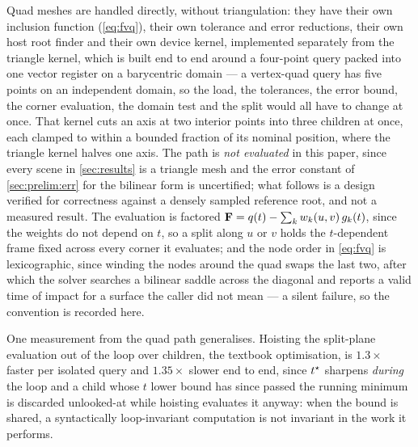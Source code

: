 Quad meshes are handled directly, without triangulation: they have their own
inclusion function (\cref{eq:fvq}), their own tolerance and error reductions,
their own host root finder and their own device kernel, implemented separately
from the triangle kernel, which is built end to end around a four-point query
packed into one vector register on a barycentric domain --- a vertex-quad query
has five points on an independent domain, so the load, the tolerances, the error
bound, the corner evaluation, the domain test and the split would all have to
change at once. That kernel cuts an axis at two interior points into three
children at once, each clamped to within a bounded fraction of its nominal
position, where the triangle kernel halves one axis. The path is \emph{not evaluated} in this paper, since every scene
in \cref{sec:results} is a triangle mesh and the error constant of
\cref{sec:prelim:err} for the bilinear form is uncertified; what follows is a
design verified for correctness against a densely sampled reference root, and not
a measured result. The evaluation is factored $\mathbf{F} = q(t) - \sum_{k}
w_{k}(u,v)\,g_{k}(t)$, since the weights do not depend on $t$, so a split along
$u$ or $v$ holds the $t$-dependent frame fixed across every corner it evaluates;
and the node order in \cref{eq:fvq} is lexicographic, since winding the nodes
around the quad swaps the last two, after which the solver searches a bilinear
saddle across the diagonal and reports a valid time of impact for a surface the
caller did not mean --- a silent failure, so the convention is recorded here.

One measurement from the quad path generalises. Hoisting the split-plane
evaluation out of the loop over children, the textbook optimisation, is
$1.3\times$ faster per isolated query and $1.35\times$ slower end to end, since
$t^{\star}$ sharpens \emph{during} the loop and a child whose $t$ lower bound has since
passed the running minimum is discarded unlooked-at while hoisting evaluates it
anyway: when the bound is shared, a syntactically loop-invariant computation is
not invariant in the work it performs.

